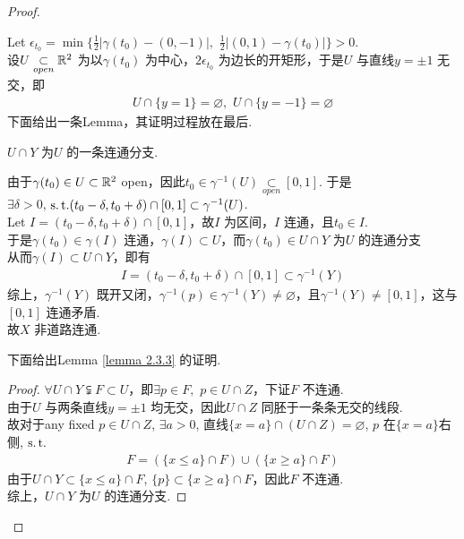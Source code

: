 \begin{example}
\begin{proof}
\begin{itemize}
				\vspace{1em}
				Let $\epsilon_{t_0} = \min\{ \frac{1}{2} \left| \gamma(t_0) - (0 , -1) \right| , \,\, \frac{1}{2} \left| (0 , 1) - \gamma(t_0) \right| \} > 0$.\\
				设$U \underset{open}{\subset} \mathbb{R}^2$ 为以$\gamma(t_0)$ 为中心，$2 \epsilon_{t_0}$ 为边长的开矩形，于是$U$ 与直线$y = \pm1$ 无交，即
				\begin{align}
					U \cap \{ y = 1 \} = \varnothing , \,\, U \cap \{ y = -1 \} = \varnothing
				\end{align}
				下面给出一条Lemma，其证明过程放在最后.
				\begin{lemma}\label{lemma 2.3.3}
					$U \cap Y$ 为$U$ 的一条连通分支.
				\end{lemma}
				由于$\gamma(t_0) \in U \subset \mathbb{R}^2$ open，因此$t_0 \in \gamma^{-1}(U) \underset{open}{\subset} [0 , 1]$. 于是\\
				$\exists \delta > 0$, $\operatorname{s.t.} (t_0 - \delta , t_0 + \delta) \cap [0 , 1] \subset \gamma^{-1}(U)$.\\
				Let $I = (t_0 - \delta , t_0 + \delta) \cap [0 , 1]$，故$I$ 为区间，$I$ 连通，且$t_0 \in I$.\\
				于是$\gamma(t_0) \in \gamma(I)$ 连通，$\gamma(I) \subset U$，而$\gamma(t_0) \in U \cap Y$ 为$U$ 的连通分支\\
				从而$\gamma(I) \subset U \cap Y$，即有
				\begin{align}
					I = (t_0 - \delta , t_0 + \delta) \cap [0 , 1] \subset \gamma^{-1}(Y)
				\end{align}
				综上，$\gamma^{-1}(Y)$ 既开又闭，$\gamma^{-1}(p) \in \gamma^{-1}(Y) \neq \varnothing$，且$\gamma^{-1}(Y) \neq [0 , 1]$，这与$[0 , 1]$ 连通矛盾.\\
				故$X$ 非道路连通.
				
				\vspace{1em}
				下面给出Lemma \ref{lemma 2.3.3} 的证明.
				\begin{proof}
					$\forall U \cap Y \subsetneqq F \subset U$，即$\exists p \in F , \,\, p \in U \cap Z$，下证$F$ 不连通. \\
					由于$U$ 与两条直线$y = \pm1$ 均无交，因此$U \cap Z$ 同胚于一条条无交的线段.\\
					故对于any fixed $p \in U \cap Z$, $\exists a > 0$, 直线$\{ x = a \} \cap (U \cap Z) = \varnothing$, $p$ 在$\{ x = a \}$右侧, $\operatorname{s.t.}$
					\begin{align}
						F = (\{ x \leq a \} \cap F) \cup (\{ x \geq a \} \cap F)
					\end{align}
					由于$U \cap Y \subset \{ x \leq a \} \cap F$, $\{ p \} \subset \{ x \geq a \} \cap F$，因此$F$ 不连通.\\
					综上，$U \cap Y$ 为$U$ 的连通分支.
				\end{proof}
			\end{itemize}
		\end{proof}
	\end{example}

